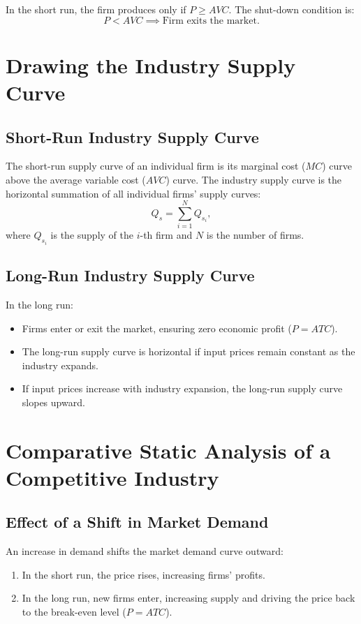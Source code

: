 In the short run, the firm produces only if \(P \geq AVC\). The shut-down condition is:
\[
P < AVC \implies \text{Firm exits the market.}
\]

\section*{Drawing the Industry Supply Curve}
\subsection*{Short-Run Industry Supply Curve}
The short-run supply curve of an individual firm is its marginal cost (\(MC\)) curve above the average variable cost (\(AVC\)) curve. The industry supply curve is the horizontal summation of all individual firms' supply curves:
\[
Q_s = \sum_{i=1}^N Q_{s_i},
\]
where \(Q_{s_i}\) is the supply of the \(i\)-th firm and \(N\) is the number of firms.

\subsection*{Long-Run Industry Supply Curve}
In the long run:
\begin{itemize}
    \item Firms enter or exit the market, ensuring zero economic profit (\(P = ATC\)).
    \item The long-run supply curve is horizontal if input prices remain constant as the industry expands.
    \item If input prices increase with industry expansion, the long-run supply curve slopes upward.
\end{itemize}

\section*{Comparative Static Analysis of a Competitive Industry}
\subsection*{Effect of a Shift in Market Demand}
An increase in demand shifts the market demand curve outward:
\begin{enumerate}
    \item In the short run, the price rises, increasing firms’ profits.
    \item In the long run, new firms enter, increasing supply and driving the price back to the break-even level (\(P = ATC\)).
\end{enumerate}

